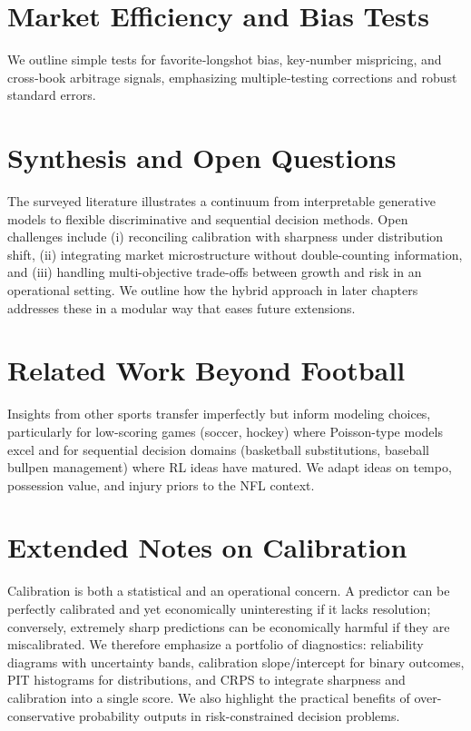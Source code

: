 \section{Market Efficiency and Bias Tests}
We outline simple tests for favorite‑longshot bias, key‑number mispricing, and cross‑book arbitrage signals, emphasizing multiple‑testing corrections and robust standard errors.

\section{Synthesis and Open Questions}
The surveyed literature illustrates a continuum from interpretable generative models to flexible discriminative and sequential decision methods. Open challenges include (i) reconciling calibration with sharpness under distribution shift, (ii) integrating market microstructure without double-counting information, and (iii) handling multi-objective trade-offs between growth and risk in an operational setting. We outline how the hybrid approach in later chapters addresses these in a modular way that eases future extensions.

\section{Related Work Beyond Football}
Insights from other sports transfer imperfectly but inform modeling choices, particularly for low-scoring games (soccer, hockey) where Poisson-type models excel and for sequential decision domains (basketball substitutions, baseball bullpen management) where RL ideas have matured. We adapt ideas on tempo, possession value, and injury priors to the NFL context.

\section{Extended Notes on Calibration}
Calibration is both a statistical and an operational concern. A predictor can be perfectly calibrated and yet economically uninteresting if it lacks resolution; conversely, extremely sharp predictions can be economically harmful if they are miscalibrated. We therefore emphasize a portfolio of diagnostics: reliability diagrams with uncertainty bands, calibration slope/intercept for binary outcomes, PIT histograms for distributions, and CRPS to integrate sharpness and calibration into a single score. We also highlight the practical benefits of over-conservative probability outputs in risk-constrained decision problems.

